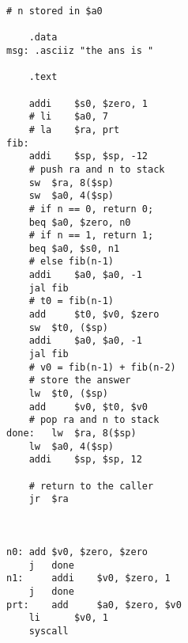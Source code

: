 \documentclass[lang=cn,11pt,a4paper,cite=authoryear]{elegantpaper}
\begin{document}
\begin{lstlisting}
# n stored in $a0

	.data
msg: .asciiz "the ans is "

	.text

	addi 	$s0, $zero, 1
	# li	$a0, 7
	# la	$ra, prt
fib:	
	addi	$sp, $sp, -12
	# push ra and n to stack
	sw 	$ra, 8($sp)
	sw 	$a0, 4($sp)
	# if n == 0, return 0; 
	beq	$a0, $zero, n0
	# if n == 1, return 1;
	beq	$a0, $s0, n1
	# else fib(n-1)
	addi 	$a0, $a0, -1
	jal	fib
	# t0 = fib(n-1)
	add 	$t0, $v0, $zero
	sw 	$t0, ($sp) 
	addi 	$a0, $a0, -1
	jal	fib
	# v0 = fib(n-1) + fib(n-2)
	# store the answer
	lw	$t0, ($sp)
	add 	$v0, $t0, $v0
	# pop ra and n to stack 
done:	lw	$ra, 8($sp)
	lw	$a0, 4($sp)
	addi 	$sp, $sp, 12
	
	# return to the caller
	jr	$ra
	
	

n0:	add	$v0, $zero, $zero
	j	done 
n1: 	addi	$v0, $zero, 1
	j 	done
prt:	add 	$a0, $zero, $v0
	li      $v0, 1
	syscall 
	
	
\end{lstlisting}







\end{document}
